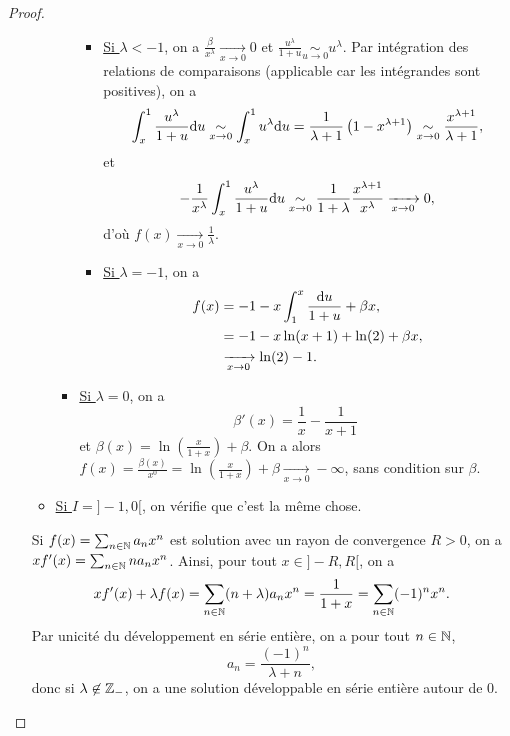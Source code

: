 \documentclass[12pt]{article}
\begin{document}
\begin{proof}
\begin{enumerate}
\begin{itemize}
\begin{itemize}
\begin{itemize}
					\item \underline{Si $\lambda<-1$}, on a $\frac{\beta}{x^{\lambda}}\xrightarrow[x\to0]{}0$ et $\frac{u^{\lambda}}{1+u}\underset{u\to0}{\sim}u^{\lambda}$. Par intégration des relations de comparaisons (applicable car les intégrandes sont positives), on a 
					\begin{equation*}
						\int_{x}^{1}\frac{u^{\lambda}}{1+u}\mathrm{d} u\underset{x\to0}{\sim}\int_{x}^{1}u^{\lambda}\mathrm{d} u=\frac{1}{\lambda+1}\left(1-x^{\lambda+1}\right)\underset{x\to0}{\sim}\frac{x^{\lambda+1}}{\lambda+1},
					\end{equation*}
					et
					\begin{equation*}
						-\frac{1}{x^{\lambda}}\int_{x}^{1}\frac{u^{\lambda}}{1+u}\mathrm{d} u\underset{x\to0}{\sim}\frac{1}{1+\lambda}\frac{x^{\lambda+1}}{x^{\lambda}}\xrightarrow[x\to0]{}0,
					\end{equation*}
					d'où $f(x)\xrightarrow[x\to0]{}\frac{1}{\lambda}$.

					\item \underline{Si $\lambda=-1$}, on a 
					\begin{align*}
						f(x)
						&=-1-x\int_{1}^{x}\frac{\mathrm{d} u}{1+u}+\beta x,\\
						&=-1-x\ln(x+1)+\ln(2)+\beta x,\\
						&\xrightarrow[x\to0]{}\ln(2)-1.
					\end{align*}
				\end{itemize}

				\item \underline{Si $\lambda=0$}, on a 
				\begin{equation*}
					\beta'(x)=\frac{1}{x}-\frac{1}{x+1}
				\end{equation*}
				et $\beta(x)=\ln\left(\frac{x}{1+x}\right)+\beta$. On a alors $f(x)=\frac{\beta(x)}{x^{0}}=\ln\left(\frac{x}{1+x}\right)+\beta\xrightarrow[x\to0]{}-\infty$, sans condition sur $\beta$.
			\end{itemize}

			\item \underline{Si $I=]-1,0[$}, on vérifie que c'est la même chose.
		\end{itemize}

		Si $f(x)=\sum_{n\in\mathbb{N}}a_n x^{n}$ est solution avec un rayon de convergence $R>0$, on a $xf'(x)=\sum_{n\in\mathbb{N}}na_nx^{n}$. Ainsi, pour tout $x\in]-R,R[$, on a
		\begin{equation*}
			xf'(x)+\lambda f(x)=\sum_{n\in\mathbb{N}}(n+\lambda)a_nx^{n}=\frac{1}{1+x}=\sum_{n\in\mathbb{N}}(-1)^{n}x^{n}.
		\end{equation*}
		Par unicité du développement en série entière, on a pour tout $n\in\mathbb{N}$,
		\begin{equation*}
			a_n=\frac{(-1)^{n}}{\lambda+n},
		\end{equation*}
		donc si $\lambda\not\in\mathbb{Z}_{-}$, on a une solution développable en série entière autour de 0.


\end{enumerate}
\end{proof}
\end{document}
